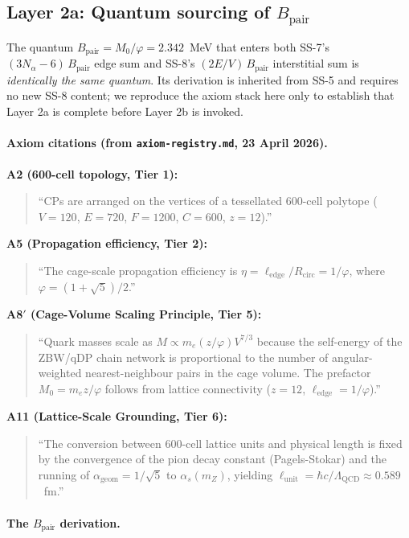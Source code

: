 \documentclass[11pt,letterpaper]{article}
\theoremstyle{definition}
\newcommand{\Mzero}{M_0}
\newcommand{\phig}{\varphi}
\newcommand{\Bpair}{B_{\text{pair}}}
\newcommand{\Nalpha}{N_\alpha}
\newcommand{\lunit}{\ell_{\text{unit}}}
\newcommand{\ledge}{\ell_{\text{edge}}}
\begin{document}
\subsection{Layer 2a: Quantum sourcing of $\Bpair$}
\label{sec:layer2a}

The quantum $\Bpair = \Mzero/\phig = 2.342$~MeV that enters both SS-7's $(3\Nalpha - 6)\,\Bpair$ edge sum and SS-8's $(2E/V)\,\Bpair$ interstitial sum is \emph{identically the same quantum}. Its derivation is inherited from SS-5 and requires no new SS-8 content; we reproduce the axiom stack here only to establish that Layer 2a is complete before Layer 2b is invoked.

\paragraph{Axiom citations (from \texttt{axiom-registry.md}, 23 April 2026).}

\textbf{A2 (600-cell topology, Tier 1):}
\begin{quote}\small
``CPs are arranged on the vertices of a tessellated 600-cell polytope ($V=120$, $E=720$, $F=1200$, $C=600$, $z=12$).''
\end{quote}

\textbf{A5 (Propagation efficiency, Tier 2):}
\begin{quote}\small
``The cage-scale propagation efficiency is $\eta = \ledge / R_{\text{circ}} = 1/\phig$, where $\phig = (1+\sqrt{5})/2$.''
\end{quote}

\textbf{A8$'$ (Cage-Volume Scaling Principle, Tier 5):}
\begin{quote}\small
``Quark masses scale as $M \propto m_e (z/\phig) V^{7/3}$ because the self-energy of the ZBW/qDP chain network is proportional to the number of angular-weighted nearest-neighbour pairs in the cage volume. The prefactor $\Mzero = m_e z/\phig$ follows from lattice connectivity ($z=12$, $\ledge = 1/\phig$).''
\end{quote}

\textbf{A11 (Lattice-Scale Grounding, Tier 6):}
\begin{quote}\small
``The conversion between 600-cell lattice units and physical length is fixed by the convergence of the pion decay constant (Pagels-Stokar) and the running of $\alpha_{\text{geom}} = 1/\sqrt{5}$ to $\alpha_s(m_Z)$, yielding $\lunit = \hbar c/\Lambda_{\text{QCD}} \approx 0.589$~fm.''
\end{quote}

\paragraph{The $\Bpair$ derivation.}
\end{document}
